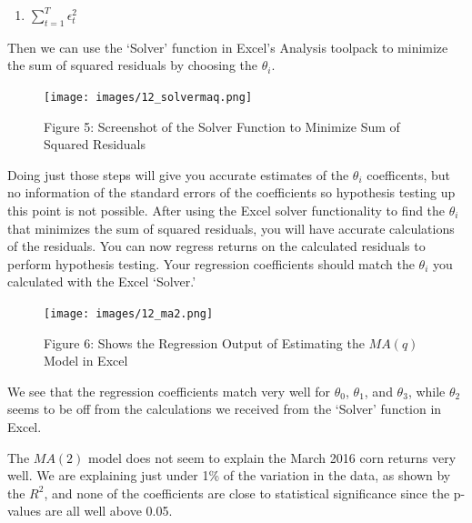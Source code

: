 \documentclass[
]{book}
\providecommand{\tightlist}{%
  \setlength{\itemsep}{0pt}\setlength{\parskip}{0pt}}
\begin{document}
\begin{enumerate}
\def\labelenumi{\arabic{enumi}.}
\setcounter{enumi}{3}
\tightlist
\item
  \(\sum_{t=1}^{T} \epsilon_t^2\)
\end{enumerate}

Then we can use the `Solver' function in Excel's Analysis toolpack to minimize the sum of squared residuals by choosing the \(\theta_i\).

\begin{figure}
\centering
\texttt{[image: images/12\_solvermaq.png]}
\caption{Figure 5: Screenshot of the Solver Function to Minimize Sum of Squared Residuals}
\end{figure}

Doing just those steps will give you accurate estimates of the \(\theta_i\) coefficents, but no information of the standard errors of the coefficients so hypothesis testing up this point is not possible. After using the Excel solver functionality to find the \(\theta_i\) that minimizes the sum of squared residuals, you will have accurate calculations of the residuals. You can now regress returns on the calculated residuals to perform hypothesis testing. Your regression coefficients should match the \(\theta_i\) you calculated with the Excel `Solver.'

\begin{figure}
\centering
\texttt{[image: images/12\_ma2.png]}
\caption{Figure 6: Shows the Regression Output of Estimating the \(MA(q)\) Model in Excel}
\end{figure}

We see that the regression coefficients match very well for \(\theta_0\), \(\theta_1\), and \(\theta_3\), while \(\theta_2\) seems to be off from the calculations we received from the `Solver' function in Excel.

The \(MA(2)\) model does not seem to explain the March 2016 corn returns very well. We are explaining just under 1\% of the variation in the data, as shown by the \(R^2\), and none of the coefficients are close to statistical significance since the p-values are all well above 0.05.
\end{document}
